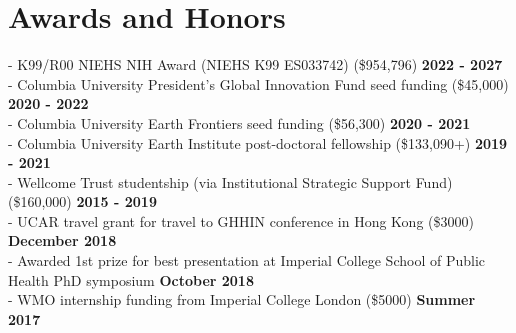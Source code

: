 \section*{Awards and Honors}
- K99/R00 NIEHS NIH Award (NIEHS K99 ES033742) (\$954,796) \hfill \textbf{2022 - 2027}\\
- Columbia University President’s Global Innovation Fund seed funding (\$45,000) \hfill \textbf{2020 - 2022}\\
- Columbia University Earth Frontiers seed funding (\$56,300) \hfill \textbf{2020 - 2021}\\
- Columbia University Earth Institute post-doctoral fellowship (\$133,090+) \textbf {\hfill 2019 - 2021}\\
-  Wellcome Trust studentship (via Institutional Strategic Support Fund) (\$160,000) \textbf {\hfill 2015 - 2019}\\	
- UCAR travel grant for travel to GHHIN conference in Hong Kong (\$3000) \textbf {\hfill December 2018}\\	
- Awarded 1st prize for best presentation at Imperial College School of Public Health PhD symposium \textbf {\hfill October 2018}\\
- WMO internship funding from Imperial College London (\$5000) \textbf{ {\hfill  Summer 2017}}\\

